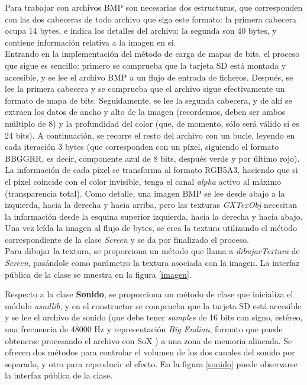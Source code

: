 Para trabajar con archivos BMP son necesarias dos estructuras, que corresponden con las dos cabeceras de todo archivo que siga este formato: la primera cabecera ocupa 14 bytes, e indica los detalles del archivo; la segunda son 40 bytes, y contiene información relativa a la imagen en sí.\\

Entrando en la implementación del método de carga de mapas de bits, el proceso que sigue es sencillo: primero se comprueba que la tarjeta SD está montada y accesible, y se lee el archivo BMP a un flujo de entrada de ficheros. Después, se lee la primera cabecera y se comprueba que el archivo sigue efectivamente un formato de mapa de bits. Seguidamente, se lee la segunda cabecera, y de ahí se extraen los datos de ancho y alto de la imagen (recordemos, deben ser ambos múltiplo de 8) y la profundidad del color (que, de momento, sólo será válido si es 24 bits). A continuación, se recorre el resto del archivo con un bucle, leyendo en cada iteración 3 bytes (que corresponden con un píxel, siguiendo el formato BBGGRR, es decir, componente azul de 8 bits, después verde y por último rojo). La información de cada píxel se transforma al formato RGB5A3, haciendo que si el píxel coincide con el color invisible, tenga el canal \emph{alpha} activo al máximo (transparencia total). Como detalle, una imagen BMP se lee desde abajo a la izquierda, hacia la derecha y hacia arriba, pero las texturas \emph{GXTexObj} necesitan la información desde la esquina superior izquierda, hacia la derecha y hacia abajo. Una vez leída la imagen al flujo de bytes, se crea la textura utilizando el método correspondiente de la clase \emph{Screen} y se da por finalizado el proceso.\\

Para dibujar la textura, se proporciona un método que llama a \emph{dibujarTextura} de \emph{Screen}, pasándole como parámetro la textura asociada con la imagen. La interfaz pública de la clase se muestra en la figura \ref{imagen}.\\


Respecto a la clase \textbf{Sonido}, se proporciona un método de clase que inicializa el módulo \emph{asndlib}, y en el constructor se comprueba que la tarjeta SD está accesible y se lee el archivo de sonido (que debe tener \emph{samples} de 16 bits con signo, estéreo, una frecuencia de 48000 Hz y representación \emph{Big Endian}, formato que puede obtenerse procesando el archivo con SoX \cite{website:sox}) a una zona de memoria alineada. Se ofrecen dos métodos para controlar el volumen de los dos canales del sonido por separado, y otro para reproducir el efecto. En la figura \ref{sonido} puede observarse la interfaz pública de la clase.\\


